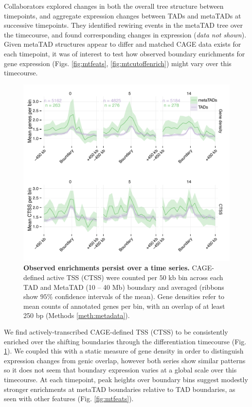 \documentclass[a4paper,11pt,oneside]{book}
\begin{document}
Collaborators explored changes in both the overall tree structure between timepoints, and aggregate expression changes between TADs and metaTADs at successive timepoints. They identified rewiring events in the metaTAD tree over the timecourse, and found corresponding changes in expression (\emph{data not shown}). Given metaTAD structures appear to differ and matched CAGE data exists for each timepoint, it was of interest to test how observed boundary enrichments for gene expression (Figs. \ref{fig:mtfeats}, \ref{fig:mtcutoffenrich}) might vary over this timecourse. 

\begin{figure}
\begin{center} 
\includegraphics[width=4.5in]{figs/mt_ts.pdf}
\captionsetup{width=\textwidth}
\caption[Observed enrichments persist over a time series.]{ {\bf Observed enrichments persist over a time series.}
CAGE-defined active TSS (CTSS) were counted per $50$ kb bin across each TAD and MetaTAD (10 -- 40 Mb) boundary and averaged (ribbons show $95\%$ confidence intervals of the mean). Gene densities refer to mean counts of annotated genes per bin, with an overlap of at least 250 bp (Methods \ref{meth:metadata}).
}\label{fig:mtts}
\end{center}
\end{figure} 

We find actively-transcribed CAGE-defined TSS (CTSS) to be consistently enriched over the shifting boundaries through the differentiation timecourse (Fig. \ref{fig:mtts}). We coupled this with a static measure of gene density in order to distinguish expression changes from genic overlap, however both series show similar patterns so it does not seem that boundary expression varies at a global scale over this timecourse. At each timepoint, peak heights over boundary bins suggest modestly stronger enrichments at metaTAD boundaries relative to TAD boundaries, as seen with other features (Fig. \ref{fig:mtfeats}). 
\end{document}
